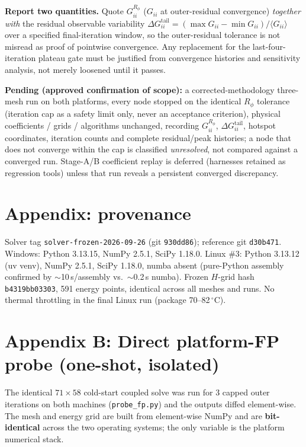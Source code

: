 \documentclass[11pt]{article}
\begin{document}
\textbf{Report two quantities.} Quote $G_{ii}^{R_\phi}$ ($G_{ii}$ at outer-residual convergence) \emph{together with} the residual observable variability $\Delta G_{ii}^{\mathrm{tail}}=(\max G_{ii}-\min G_{ii})/\langle G_{ii}\rangle$ over a specified final-iteration window, so the outer-residual tolerance is not misread as proof of pointwise convergence. Any replacement for the last-four-iteration plateau gate must be justified from convergence histories and sensitivity analysis, not merely loosened until it passes.

\textbf{Pending (approved confirmation of scope):} a corrected-methodology three-mesh run on both platforms, every node stopped on the identical $R_\phi$ tolerance (iteration cap as a safety limit only, never an acceptance criterion), physical coefficients / grids / algorithms unchanged, recording $G_{ii}^{R_\phi}$, $\Delta G_{ii}^{\mathrm{tail}}$, hotspot coordinates, iteration counts and complete residual/peak histories; a node that does not converge within the cap is classified \emph{unresolved}, not compared against a converged run. Stage-A/B coefficient replay is deferred (harnesses retained as regression tools) unless that run reveals a persistent converged discrepancy.

\section*{Appendix: provenance}
Solver tag \texttt{solver-frozen-2026-09-26} (git \texttt{930dd86}); reference git \texttt{d30b471}. Windows: Python 3.13.15, NumPy 2.5.1, SciPy 1.18.0. Linux \#3: Python 3.13.12 (uv venv), NumPy 2.5.1, SciPy 1.18.0, numba absent (pure-Python assembly confirmed by $\sim$10\,s/assembly vs.\ $\sim$0.2\,s numba). Frozen $H$-grid hash \texttt{b4319bb03303}, 591 energy points, identical across all meshes and runs. No thermal throttling in the final Linux run (package 70--82\,$^\circ$C).

\section*{Appendix B: Direct platform-FP probe (one-shot, isolated)}
The identical $71\times58$ cold-start coupled solve was run for 3 capped outer iterations on both machines (\texttt{probe\_fp.py}) and the outputs diffed element-wise. The mesh and energy grid are built from element-wise NumPy and are \textbf{bit-identical} across the two operating systems; the only variable is the platform numerical stack.
\end{document}

